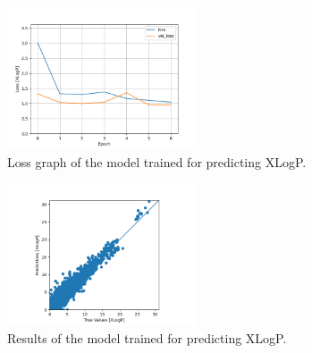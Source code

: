     \begin{figure}
        \centering
        \includegraphics[width=0.5\textwidth]{model_7_7_epochs_loss_XLogP.png}
        \caption{Loss graph of the model trained for predicting XLogP.}
        \label{fig:model7-xlogp-loss}
    \end{figure}
    \begin{figure}
        \centering
        \includegraphics[width=0.5\textwidth]{model_7_7_epochs_predictions_XLogP.png}
        \caption{Results of the model trained for predicting XLogP.}
        \label{fig:model7-xlogp-predictions}
    \end{figure}
    
